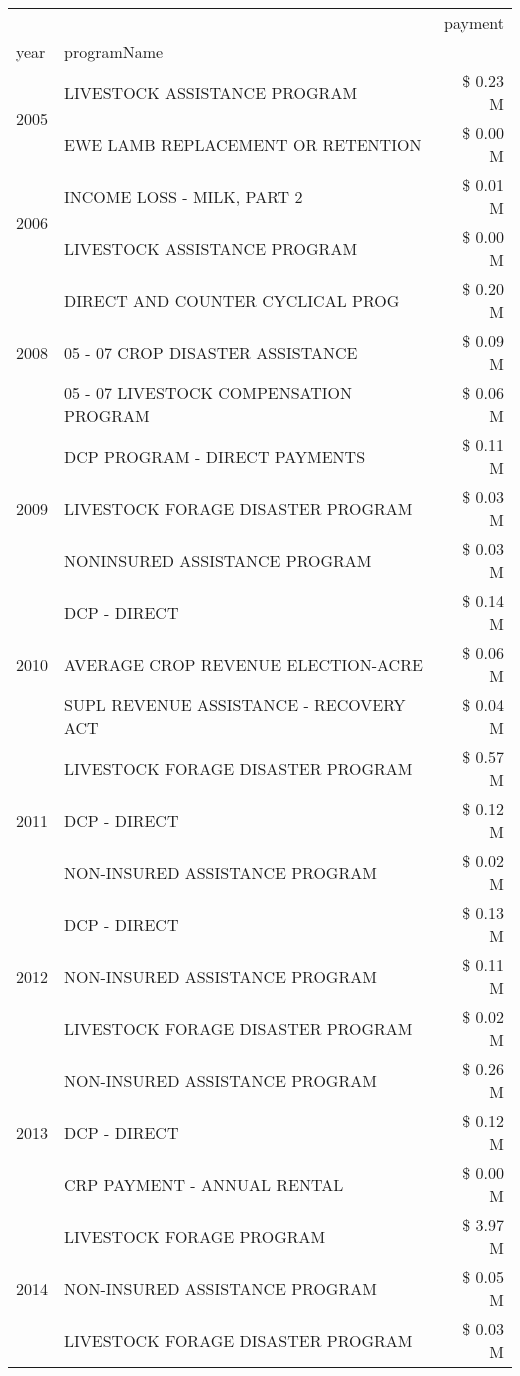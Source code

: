 \begin{tabular}{llr}
\toprule
 &  & payment \\
year & programName &  \\
\midrule
\multirow[t]{2}{*}{2005} & LIVESTOCK ASSISTANCE PROGRAM & \$ 0.23 M \\
 & EWE LAMB REPLACEMENT OR RETENTION & \$ 0.00 M \\
\cline{1-3}
\multirow[t]{2}{*}{2006} & INCOME LOSS - MILK, PART 2 & \$ 0.01 M \\
 & LIVESTOCK ASSISTANCE PROGRAM & \$ 0.00 M \\
\cline{1-3}
\multirow[t]{3}{*}{2008} & DIRECT AND COUNTER CYCLICAL PROG & \$ 0.20 M \\
 & 05 - 07 CROP DISASTER ASSISTANCE & \$ 0.09 M \\
 & 05 - 07 LIVESTOCK COMPENSATION PROGRAM & \$ 0.06 M \\
\cline{1-3}
\multirow[t]{3}{*}{2009} & DCP PROGRAM - DIRECT PAYMENTS & \$ 0.11 M \\
 & LIVESTOCK FORAGE DISASTER  PROGRAM & \$ 0.03 M \\
 & NONINSURED ASSISTANCE PROGRAM & \$ 0.03 M \\
\cline{1-3}
\multirow[t]{3}{*}{2010} & DCP - DIRECT & \$ 0.14 M \\
 & AVERAGE CROP REVENUE ELECTION-ACRE & \$ 0.06 M \\
 & SUPL REVENUE ASSISTANCE - RECOVERY ACT & \$ 0.04 M \\
\cline{1-3}
\multirow[t]{3}{*}{2011} & LIVESTOCK FORAGE DISASTER PROGRAM & \$ 0.57 M \\
 & DCP - DIRECT & \$ 0.12 M \\
 & NON-INSURED ASSISTANCE PROGRAM & \$ 0.02 M \\
\cline{1-3}
\multirow[t]{3}{*}{2012} & DCP - DIRECT & \$ 0.13 M \\
 & NON-INSURED ASSISTANCE PROGRAM & \$ 0.11 M \\
 & LIVESTOCK FORAGE DISASTER PROGRAM & \$ 0.02 M \\
\cline{1-3}
\multirow[t]{3}{*}{2013} & NON-INSURED ASSISTANCE PROGRAM & \$ 0.26 M \\
 & DCP - DIRECT & \$ 0.12 M \\
 & CRP PAYMENT - ANNUAL RENTAL & \$ 0.00 M \\
\cline{1-3}
\multirow[t]{3}{*}{2014} & LIVESTOCK FORAGE PROGRAM & \$ 3.97 M \\
 & NON-INSURED ASSISTANCE PROGRAM & \$ 0.05 M \\
 & LIVESTOCK FORAGE DISASTER PROGRAM & \$ 0.03 M \\

\end{tabular}
